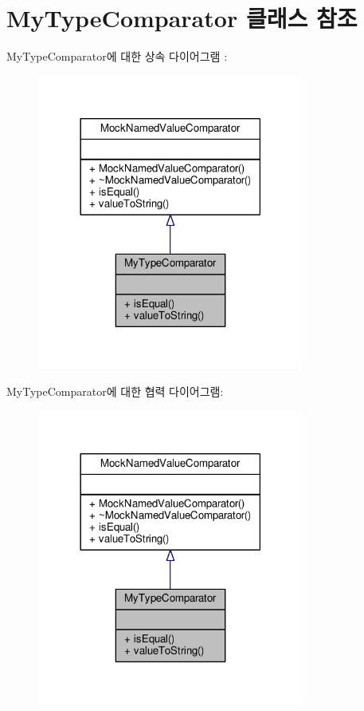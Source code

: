\hypertarget{class_my_type_comparator}{}\section{My\+Type\+Comparator 클래스 참조}
\label{class_my_type_comparator}


My\+Type\+Comparator에 대한 상속 다이어그램 \+: 
\nopagebreak
\begin{figure}[H]
\begin{center}
\leavevmode
\includegraphics[width=249pt]{class_my_type_comparator__inherit__graph}
\end{center}
\end{figure}


My\+Type\+Comparator에 대한 협력 다이어그램\+:
\nopagebreak
\begin{figure}[H]
\begin{center}
\leavevmode
\includegraphics[width=249pt]{class_my_type_comparator__coll__graph}
\end{center}
\end{figure}

